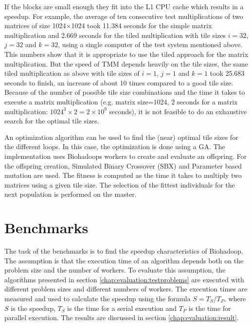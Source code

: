 If the blocks are small enough they fit into the L1 CPU cache which results in a speedup. For example, the average of ten consecutive test multiplications of two matrices of size 1024$\times$1024 took 11.384 seconds for the simple matrix multiplication and 2.669 seconds for the tiled multiplication with tile sizes $i=32$, $j=32$ and $k=32$, using a single computer of the test system mentioned above. This numbers show that it is appropriate to use the tiled approach for the matrix multiplication. But the speed of TMM depends heavily on the tile sizes, the same tiled multiplication as above with tile sizes of $i=1$, $j=1$ and $k=1$ took 25.683 seconds to finish, an increase of about 10 times compared to a good tile size. Because of the number of possible tile size combinations and the time it takes to execute a matrix multiplication (e.g. matrix size=1024, 2 seconds for a matrix multiplication: $1024^3 \times 2 = 2\times{10^9} $ seconds), it is not feasible to do an exhaustive search for the optimal tile sizes.

An optimization algorithm can be used to find the (near) optimal tile sizes for the different loops. In this case, the optimization is done using a GA. The implementation uses Biohadoops workers to create and evaluate an offspring. For the offspring creation, Simulated Binary Crossover (SBX) and Parameter based mutation are used. The fitness is computed as the time it takes to multiply two matrices using a given tile size. The selection of the fittest individuals for the next population is performed on the master.

\section{Benchmarks}
\label{chap:evaluation:benchmarks}
The task of the benchmarks is to find the speedup characteristics of Biohadoop. The assumption is that the execution time of an algorithm depends both on the problem size and the number of workers. To evaluate this assumption, the algorithms presented in section \ref{chap:evaluation:testproblems} are executed with different problem sizes and different numbers of workers. The execution times are measured and used to calculate the speedup using the formula $S = T_S / T_P$, where $S$ is the speedup, $T_S$ is the time for a serial execution and $T_P$ is the time for parallel execution. The results are discussed in section \ref{chap:evaluation:result}.


